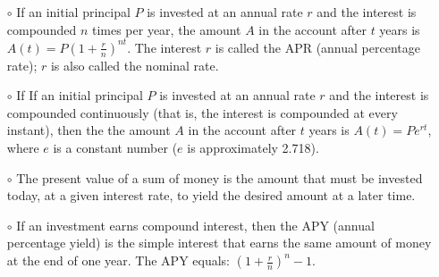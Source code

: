 \documentclass[12pt,dvipsnames]{article}
\begin{document}
\begin{mdframed}[style=testframe]
	\begin{itemize}
		\item[$\circ$] If an initial principal $P$ is invested at an annual rate
		$r$ and the interest is compounded $n$ times per year, the amount $A$ in the account after $t$ years is
		$\displaystyle A(t) = P\left ( 	1 + \frac{r}{n} \right ) ^{nt}$. The interest $r$ is called the APR (annual percentage rate); $r$ is also called the nominal rate.
		
		\item[$\circ$] If If an initial principal $P$ is invested at an annual rate
		$r$ and the interest is compounded continuously (that is, the interest is compounded at every instant), then the the amount $A$ in the account after $t$ years is
		$\displaystyle A(t) = Pe^{rt}$, where $e$ is a constant number ($e$ is approximately 2.718).
		
		\item[$\circ$] The present value of a sum of money is the amount that must be invested today, at a given interest rate, to yield the desired amount at a later time.
		
		\item[$\circ$] If an investment earns compound interest, then the APY (annual percentage yield) is the simple interest that earns the same amount of money at the end of one year. The APY equals: $\displaystyle \left ( 	1 + \frac{r}{n} \right ) ^{n}-1$.
	\end{itemize}
	
\end{mdframed}
\end{document}
